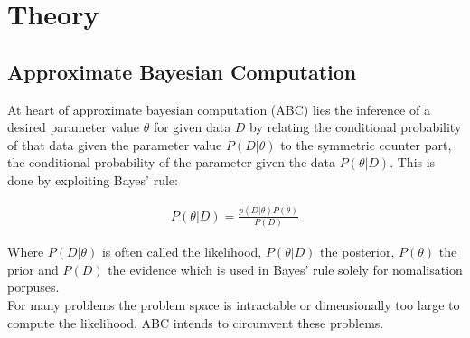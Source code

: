 \documentclass[a4paper, 11pt]{article}
\begin{document}
\section{Theory}

\subsection{Approximate Bayesian Computation}

At heart of approximate bayesian computation (ABC) lies the inference of a desired parameter value $\theta$ for given data $D$ by relating the conditional probability of that data given the parameter value $P(D | \theta)$ to the symmetric counter part, the conditional probability of the parameter given the data $P(\theta | D)$. This is done by exploiting Bayes' rule:

\begin{align*}
P(\theta | D) = \frac{p(D | \theta) P(\theta)}{P(D)}
\end{align*}

Where $P(D | \theta)$ is often called the likelihood, $P(\theta | D)$ the posterior, $P(\theta)$ the prior and $P(D)$ the evidence which is used in Bayes' rule solely for nomalisation porpuses. \\
For many problems the problem space is intractable or dimensionally too large to compute the likelihood. ABC intends to circumvent these problems.
\end{document}
